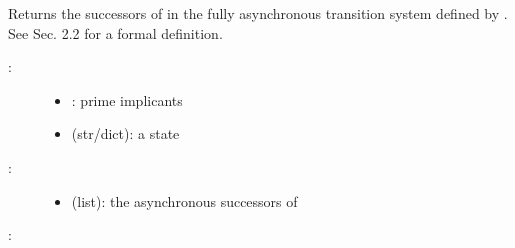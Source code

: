\documentclass[letterpaper,10pt,english]{sphinxmanual}
\begin{document}
\begin{fulllineitems}
\label{\detokenize{StateTransitionGraphs:PyBoolNet.StateTransitionGraphs.successors_asynchronous}}
Returns the successors of  in the fully asynchronous transition system defined by .
See {\hyperref[\detokenize{Bibliography:klarner2015approx}]{}} Sec. 2.2 for a formal definition.
\begin{description}
\item[{:}] \leavevmode\begin{itemize}
\item {} 
: prime implicants

\item {} 
 (str/dict): a state

\end{itemize}

\item[{:}] \leavevmode\begin{itemize}
\item {} 
 (list): the asynchronous successors of 

\end{itemize}

\end{description}

:

\begin{sphinxVerbatim}[commandchars=\\\{\}]
  
 
\end{sphinxVerbatim}

\end{fulllineitems}
\end{document}
